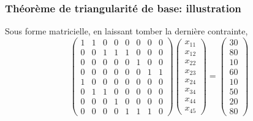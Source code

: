 \documentclass[usepdftitle=false]{beamer}
\begin{document}
\begin{frame}
\frametitle{Théorème de triangularité de base: illustration}

Sous forme matricielle, en laissant tomber la dernière contrainte,
\[
\begin{pmatrix}
 1 & 1 & 0 & 0 & 0 & 0 & 0 & 0 \\
 0 & 0 & 1 & 1 & 1 & 0 & 0 & 0 \\
 0 & 0 & 0 & 0 & 0 & 1 & 0 & 0 \\
 0 & 0 & 0 & 0 & 0 & 0 & 1 & 1 \\
 1 & 0 & 0 & 0 & 0 & 0 & 0 & 0 \\
 0 & 1 & 1 & 0 & 0 & 0 & 0 & 0 \\
 0 & 0 & 0 & 1 & 0 & 0 & 0 & 0 \\
 0 & 0 & 0 & 0 & 1 & 1 & 1 & 0
\end{pmatrix}
\begin{pmatrix}
x_{11} \\
x_{12} \\
x_{22} \\
x_{23} \\
x_{24} \\
x_{34} \\
x_{44} \\
x_{45}
\end{pmatrix}
=
\begin{pmatrix}
30 \\
80 \\
10 \\
60 \\
10 \\
50 \\
20 \\
80
\end{pmatrix}
\]

\end{frame}
\end{document}
